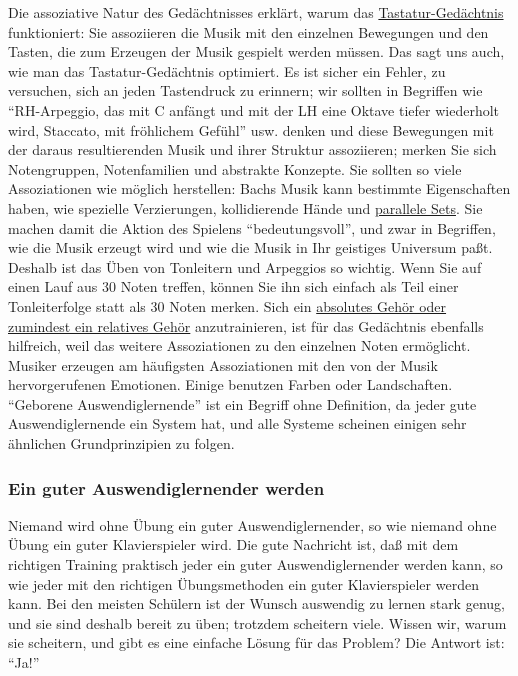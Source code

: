Die assoziative Natur des Gedächtnisses erklärt, warum das \hyperref[c1iii6tastatur]{Tastatur-Gedächtnis} funktioniert: Sie assoziieren die Musik mit den einzelnen Bewegungen und den Tasten, die zum Erzeugen der Musik gespielt werden müssen.
Das sagt uns auch, wie man das Tastatur-Gedächtnis optimiert.
Es ist sicher ein Fehler, zu versuchen, sich an jeden Tastendruck zu erinnern; wir sollten in Begriffen wie \enquote{RH-Arpeggio, das mit C anfängt und mit der LH eine Oktave tiefer wiederholt wird, Staccato, mit fröhlichem Gefühl} usw. denken und diese Bewegungen mit der daraus resultierenden Musik und ihrer Struktur assoziieren; merken Sie sich Notengruppen, Notenfamilien und abstrakte Konzepte.
Sie sollten so viele Assoziationen wie möglich herstellen: Bachs Musik kann bestimmte Eigenschaften haben, wie spezielle Verzierungen, kollidierende Hände und \hyperref[c1ii11]{parallele Sets}.
Sie machen damit die Aktion des Spielens \enquote{bedeutungsvoll}, und zwar in Begriffen, wie die Musik erzeugt wird und wie die Musik in Ihr geistiges Universum paßt.
Deshalb ist das Üben von Tonleitern und Arpeggios so wichtig.
Wenn Sie auf einen Lauf aus 30 Noten treffen, können Sie ihn sich einfach als Teil einer Tonleiterfolge statt als 30 Noten merken.
Sich ein \hyperref[c1iii12]{absolutes Gehör oder zumindest ein relatives Gehör} anzutrainieren, ist für das Gedächtnis ebenfalls hilfreich, weil das weitere Assoziationen zu den einzelnen Noten ermöglicht.
Musiker erzeugen am häufigsten Assoziationen mit den von der Musik hervorgerufenen Emotionen.
Einige benutzen Farben oder Landschaften.
\enquote{Geborene Auswendiglernende} ist ein Begriff ohne Definition, da jeder gute Auswendiglernende ein System hat, und alle Systeme scheinen einigen sehr ähnlichen Grundprinzipien zu folgen.


\subsubsection{Ein guter Auswendiglernender werden}
\label{c1iii6n}

Niemand wird ohne Übung ein guter Auswendiglernender, so wie niemand ohne Übung ein guter Klavierspieler wird.
Die gute Nachricht ist, daß mit dem richtigen Training praktisch jeder ein guter Auswendiglernender werden kann, so wie jeder mit den richtigen Übungsmethoden ein guter Klavierspieler werden kann.
Bei den meisten Schülern ist der Wunsch auswendig zu lernen stark genug, und sie sind deshalb bereit zu üben; trotzdem scheitern viele.
Wissen wir, warum sie scheitern, und gibt es eine einfache Lösung für das Problem?
Die Antwort ist: \enquote{Ja!}

